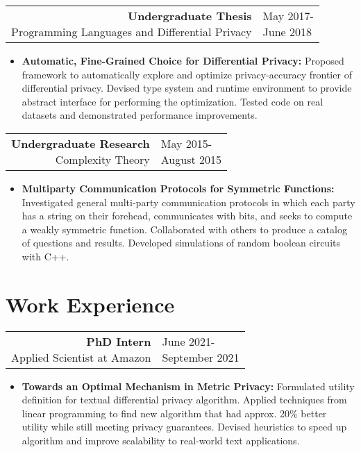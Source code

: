 \documentclass[11pt]{article}
\newcommand{\datewidth}{0.2\textwidth}
\newcommand{\descwidth}{0.755\textwidth}
\begin{document}
\begin{tabular}{rl}
\parbox[t][][t]{\descwidth}{
  \textbf{Undergraduate Thesis} \\
  Programming Languages and Differential Privacy 
} &
\parbox[t][][t]{\datewidth}{
  \raggedleft May 2017-\\June 2018
}%
\end{tabular}
\begin{itemize}
  \item \textbf{Automatic, Fine-Grained Choice for Differential Privacy:}
  Proposed framework to automatically explore and optimize privacy-accuracy
  frontier of differential privacy. Devised type system and runtime environment 
  to provide abstract interface for performing the optimization.
  Tested code on real datasets and demonstrated performance improvements.
\end{itemize}

\medskip

\begin{tabular}{rl}
\parbox[t][][t]{\descwidth}{
  \textbf{Undergraduate Research} \\
  Complexity Theory 
} &
\parbox[t][][t]{\datewidth}{
  \raggedleft May 2015-\\August 2015
}%
\end{tabular}
\begin{itemize}
  \item \textbf{Multiparty Communication Protocols for Symmetric Functions:} Investigated 
    general multi-party communication protocols in which each party has a
    string on their forehead, communicates with bits, and seeks to compute
    a weakly symmetric function.
    Collaborated with others to produce a catalog of questions and results.
    Developed simulations of random boolean circuits with C++.
\end{itemize}

\section*{Work Experience}

\begin{tabular}{rl}
\parbox[t][][t]{\descwidth}{
  \textbf{PhD Intern} \\
  Applied Scientist at Amazon
} &
\parbox[t][][t]{\datewidth}{
  \raggedleft June 2021-\\September 2021
}%
\end{tabular}
\begin{itemize}
  \item \textbf{Towards an Optimal Mechanism in Metric Privacy:}
  Formulated utility definition for textual differential privacy algorithm.
  Applied techniques from linear programming to find new algorithm that 
  had approx. 20\% better utility while still meeting privacy guarantees.
  Devised heuristics to speed up algorithm and
  improve scalability to real-world text applications.
\end{itemize}
\end{document}

